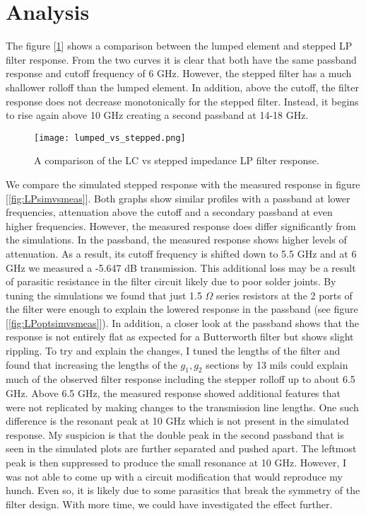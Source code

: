 \documentclass{article}
\begin{document}
\FloatBarrier
\section*{Analysis}\label{sec:analysis}

The figure [\ref{fig:LPlumpedvsstepped}] shows a comparison between the lumped element and stepped LP filter response. From the two curves it is clear that both have the same passband response and cutoff frequency of 6 GHz. However, the stepped filter has a much shallower rolloff than the lumped element. In addition, above the cutoff, the filter response does not decrease monotonically for the stepped filter. Instead, it begins to rise again above 10 GHz creating a second passband at 14-18 GHz. 

\begin{figure}[!htbp]
    \centering
    \texttt{[image: lumped\_vs\_stepped.png]}
    \caption{A comparison of the LC vs stepped impedance LP filter response.}
    \label{fig:LPlumpedvsstepped}
\end{figure}

We compare the simulated stepped response with the measured response in figure [\ref{fig:LPsimvsmeas}]. Both graphs show similar profiles with a passband at lower frequencies, attenuation above the cutoff and a secondary passband at even higher frequencies. However, the measured response does differ significantly from the simulations. In the passband, the measured response shows higher levels of attenuation. As a result, its cutoff frequency is shifted down to 5.5 GHz and at 6 GHz we measured a -5.647 dB transmission. This additional loss may be a result of parasitic resistance in the filter circuit likely due to poor solder joints. By tuning the simulations we found that just 1.5 $\Omega$ series resistors at the 2 ports of the filter were enough to explain the lowered response in the passband (see figure [\ref{fig:LPoptsimvsmeas}]). In addition, a closer look at the passband shows that the response is not entirely flat as expected for a Butterworth filter but shows slight rippling. To try and explain the changes, I tuned the lengths of the filter and found that increasing the lengths of the $g_1, g_2$ sections by 13 mils could explain much of the observed filter response including the stepper rolloff up to about 6.5 GHz. Above 6.5 GHz, the measured response showed additional features that were not replicated by making changes to the transmission line lengths. One such difference is the resonant peak at 10 GHz which is not present in the simulated response. My suspicion is that the double peak in the second passband that is seen in the simulated plots are further separated and pushed apart. The leftmost peak is then suppressed to produce the small resonance at 10 GHz. However, I was not able to come up with a circuit modification that would reproduce my hunch. Even so, it is likely due to some parasitics that break the symmetry of the filter design. With more time, we could have investigated the effect further. 
\end{document}

